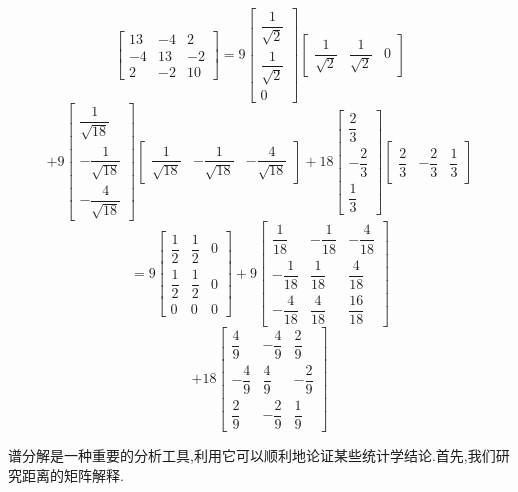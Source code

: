 \[
\begin{bmatrix} 13 & -4 & 2 \\ -4 & 13 & -2 \\ 2 & -2 & 10 \end{bmatrix} = 9\begin{bmatrix} \dfrac{1}{\sqrt{2}} \\[2mm] \dfrac{1}{\sqrt{2}} \\[2mm] 0 \end{bmatrix}\begin{bmatrix} \dfrac{1}{\sqrt{2}} & \dfrac{1}{\sqrt{2}} & 0 \end{bmatrix}
\]
\[
+ 9\begin{bmatrix} \dfrac{1}{\sqrt{18}} \\[2mm] -\dfrac{1}{\sqrt{18}} \\[2mm] -\dfrac{4}{\sqrt{18}} \end{bmatrix}\begin{bmatrix} \dfrac{1}{\sqrt{18}} & -\dfrac{1}{\sqrt{18}} & -\dfrac{4}{\sqrt{18}} \end{bmatrix} + 18\begin{bmatrix} \dfrac{2}{3} \\[2mm] -\dfrac{2}{3} \\[2mm] \dfrac{1}{3} \end{bmatrix}\begin{bmatrix} \dfrac{2}{3} & -\dfrac{2}{3} & \dfrac{1}{3} \end{bmatrix}
\]
\[
= 9\begin{bmatrix} \dfrac{1}{2} & \dfrac{1}{2} & 0 \\[2mm] \dfrac{1}{2} & \dfrac{1}{2} & 0 \\[2mm] 0 & 0 & 0 \end{bmatrix} + 9\begin{bmatrix} \dfrac{1}{18} & -\dfrac{1}{18} & -\dfrac{4}{18} \\[2mm] -\dfrac{1}{18} & \dfrac{1}{18} & \dfrac{4}{18} \\[2mm] -\dfrac{4}{18} & \dfrac{4}{18} & \dfrac{16}{18} \end{bmatrix}
\]
\[
+ 18\begin{bmatrix} \dfrac{4}{9} & -\dfrac{4}{9} & \dfrac{2}{9} \\[2mm] -\dfrac{4}{9} & \dfrac{4}{9} & -\dfrac{2}{9} \\[2mm] \dfrac{2}{9} & -\dfrac{2}{9} & \dfrac{1}{9} \end{bmatrix}
\]

谱分解是一种重要的分析工具,利用它可以顺利地论证某些统计学结论.首先,我们研究距离的矩阵解释.
